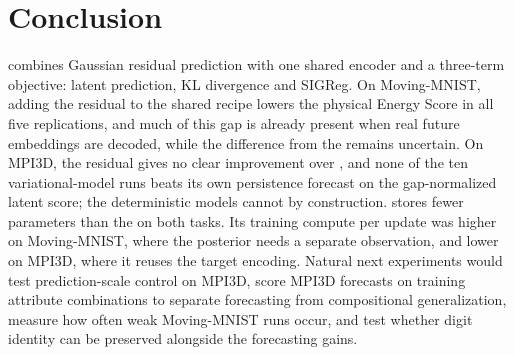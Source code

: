 \section{Conclusion}
\label{sec:conclusion}

\shvar{} combines Gaussian residual prediction with one shared encoder and a three-term objective: latent prediction, KL divergence and SIGReg. On Moving-MNIST, adding the residual to the shared recipe lowers the physical Energy Score in all five replications, and much of this gap is already present when real future embeddings are decoded, while the difference from the \emavar{} remains uncertain. On MPI3D, the residual gives no clear improvement over \shdet{}, and none of the ten variational-model runs beats its own persistence forecast on the gap-normalized latent score; the deterministic models cannot by construction. \shvar{} stores fewer parameters than the \emavar{} on both tasks. Its training compute per update was higher on Moving-MNIST, where the posterior needs a separate observation, and lower on MPI3D, where it reuses the target encoding. Natural next experiments would test prediction-scale control on MPI3D, score MPI3D forecasts on training attribute combinations to separate forecasting from compositional generalization, measure how often weak Moving-MNIST runs occur, and test whether digit identity can be preserved alongside the forecasting gains.
